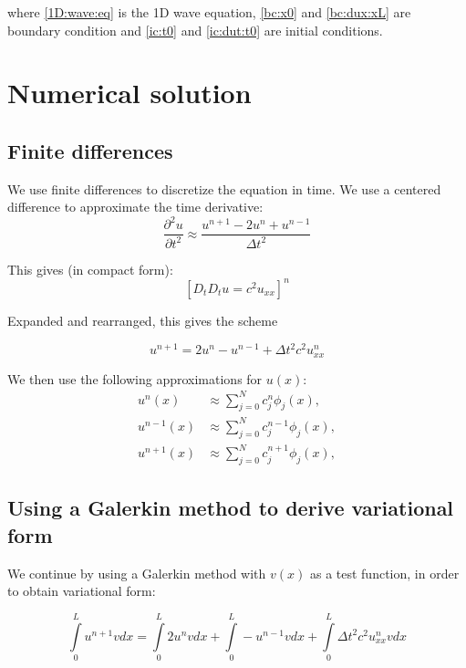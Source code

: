 \documentclass[twoside]{article}
\newcommand{\dutt}{\frac{\partial^2 u}{\partial t^2}}
\begin{document}
where \eqref{1D:wave:eq} is the 1D wave equation, \eqref{bc:x0} and \eqref{bc:dux:xL} are boundary condition and \eqref{ic:t0} and \eqref{ic:dut:t0} are initial conditions. 

\section{Numerical solution}

\subsection{Finite differences}
\label{finite:differences}

We use finite differences to discretize the equation in time. We use a centered difference to approximate the time derivative:
\begin{equation*}
\dutt \approx \frac{u^{n+1} - 2u^n + u^{n-1}}{\Delta t^2}
\end{equation*}

This gives (in compact form):
\begin{equation}
\left[D_tD_tu  = c^2u_{xx}\right]^n
\end{equation}

Expanded and rearranged, this gives the scheme

\begin{equation}
u^{n+1} = 2u^n - u^{n-1} + \Delta t^2 c^2 u^n_{xx}
\end{equation}

We then use the following approximations for $u(x):$
\begin{align}
u^n(x) &\approx \sum^N_{j=0} c_j^n\phi_j(x),     \label{u:n:approx}\\
u^{n-1}(x) &\approx \sum^N_{j=0} c_j^{n-1}\phi_j(x),     \label{u:n-1:approx}\\
u^{n+1}(x) &\approx \sum^N_{j=0} c_j^{n+1}\phi_j(x),     \label{u:n+1:approx}
\end{align}


\subsection{Using a Galerkin method to derive variational form}

We continue by using a Galerkin method with $v(x)$ as a test function, in order to obtain variational form:

\begin{equation}
\int\limits^L_0 u^{n+1} v dx = \int\limits^L_0 2u^{n} v dx + \int\limits^L_0 -u^{n-1} v dx + \int\limits^L_0 
\Delta t^2c^2 u^n_{xx} v dx
\label{galerkin:start}
\end{equation}
\end{document}
